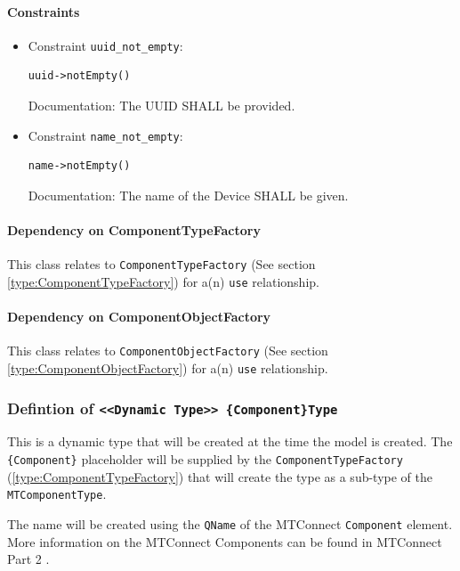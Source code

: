 \paragraph{Constraints}
\begin{itemize}
\item Constraint \texttt{uuid_not_empty}: 
   \indent \begin{lstlisting}
uuid->notEmpty()
\end{lstlisting}
Documentation: The  UUID SHALL be provided.

\end{itemize}
\begin{itemize}
\item Constraint \texttt{name_not_empty}: 
   \indent \begin{lstlisting}
name->notEmpty()
\end{lstlisting}
Documentation: The name of the Device SHALL be given.

\end{itemize}
\paragraph{Dependency on ComponentTypeFactory}

This class relates to \texttt{ComponentTypeFactory} (See section \ref{type:ComponentTypeFactory}) for a(n) \texttt{use} relationship.

\paragraph{Dependency on ComponentObjectFactory}

This class relates to \texttt{ComponentObjectFactory} (See section \ref{type:ComponentObjectFactory}) for a(n) \texttt{use} relationship.

\FloatBarrier
\subsubsection{Defintion of \texttt{<<Dynamic Type>> \{Component\}Type}} \label{type:{Component}Type}

\FloatBarrier

This is a dynamic type that will be created at the time the model is created. The 
\texttt{\{Component\}} placeholder will be supplied by the \texttt{ComponentTypeFactory} 
(\ref{type:ComponentTypeFactory}) that will create the type as a sub-type of the 
\texttt{MTComponentType}.

The name will be created using the \texttt{QName} of the MTConnect \texttt{Component} element.
More information on the MTConnect Components can be found in MTConnect Part 2 \cite{MTCPart2}.

